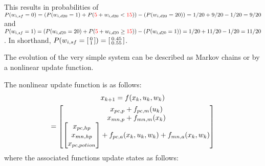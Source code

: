 \documentclass[9pt, onecolumn]{report}
\begin{document}
This results in probabilities of 
$P(w_{i,sf} = 0) = (P(w_{i,d20} = 1) + P({\color{red} 5} + w_{i,d20} < {\color{red} 15})) - (P(w_{i,d20} = 20)) = 1/20 + 9/20 - 1/20 = 9/20$ 
and 
$P(w_{i,sf} = 1) = (P(w_{i,d20} = 20) + P({\color{red} 5} + w_{i,d20} \geq {\color{red} 15})) - (P(w_{i,d20} = 1)) = 1/20 + 11/20 - 1/20 = 11/20$.
In shorthand, $P(w_{i,sf}=\smqty[0\\1]) = \smqty[0.45\\0.55]$.

The evolution of the very simple system can be described as Markov chains or by a nonlinear update function.

The nonlinear update function is as follows: \begin{multline}
    x_{k+1} = f(x_k, u_k, w_k)\\
    = \mqty[
        x_{pc,p} + f_{pc,m}(u_k)\\
        x_{mn,p} + f_{mn,m}(x_k)\\
        \mqty[x_{pc,hp}\\ x_{mn,hp} \\ x_{pc,potion}] + f_{pc,a}(x_k,u_k,w_k) + f_{mn,a}(x_k,w_k)
    ]
\end{multline}
where the associated functions update states as follows: 
\end{document}
